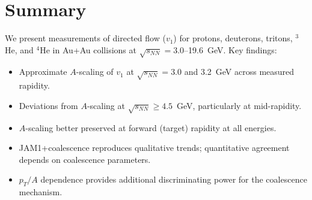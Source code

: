 \documentclass[aps,prc,preprint,superscriptaddress,nofootinbib]{revtex4-2}
\begin{document}
\section{Summary}
\label{sec:summary}

We present measurements of directed flow ($v_1$) for protons, deuterons, tritons, $^3$He, and $^4$He in Au+Au collisions at $\sqrt{s_{NN}} = 3.0$--19.6~GeV. Key findings:
\begin{itemize}
    \item Approximate $A$-scaling of $v_1$ at $\sqrt{s_{NN}} = 3.0$ and 3.2~GeV across measured rapidity.
    \item Deviations from $A$-scaling at $\sqrt{s_{NN}} \geq 4.5$~GeV, particularly at mid-rapidity.
    \item $A$-scaling better preserved at forward (target) rapidity at all energies.
    \item JAM1+coalescence reproduces qualitative trends; quantitative agreement depends on coalescence parameters.
    \item $p_T/A$ dependence provides additional discriminating power for the coalescence mechanism.
\end{itemize}

\clearpage

\end{document}
